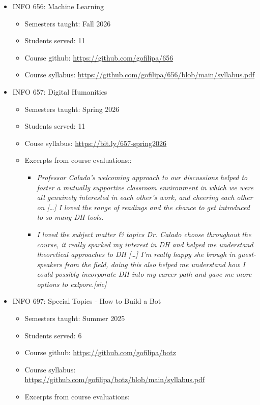 \documentclass[12pt]{article}
\begin{document}
\begin{itemize}
\item INFO 656: Machine Learning
\begin{itemize}
\item Semesters taught: Fall 2026
\item Students served: 11
\item Course github: \url{https://github.com/gofilipa/656}
\item Course syllabus:
\url{https://github.com/gofilipa/656/blob/main/syllabus.pdf}
\end{itemize}
\item INFO 657: Digital Humanities
\begin{itemize}
\item Semesters taught: Spring 2026
\item Students served:  11
\item Couse syllabus: \url{https://bit.ly/657-spring2026}
\item Excerpts from course evaluations::
\begin{itemize}
\item \emph{Professor Calado's welcoming approach to our discussions helped
to foster a mutually supportive classroom environment in which
we were all genuinely interested in each other's work, and
cheering each other on [\ldots{}] I loved the range of readings and
the chance to get introduced to so many DH tools.}
\item \emph{I loved the subject matter \& topics Dr. Calado choose
throughout the course, it really sparked my interest in DH and
helped me understand theoretical approaches to DH [\ldots{}] I'm
really happy she brough in guest-speakers from the field, doing
this also helped me understand how I could possibly incorporate
DH into my career path and gave me more options to
exlpore.[sic]}
\end{itemize}
\end{itemize}
\item INFO 697: Special Topics - How to Build a Bot
\begin{itemize}
\item Semesters taught: Summer 2025
\item Students served: 6
\item Course github: \url{https://github.com/gofilipa/botz}
\item Course syllabus: \url{https://github.com/gofilipa/botz/blob/main/syllabus.pdf}
\item Excerpts from course evaluations:
\begin{itemize}

\end{itemize}
\end{itemize}
\end{itemize}
\end{document}
